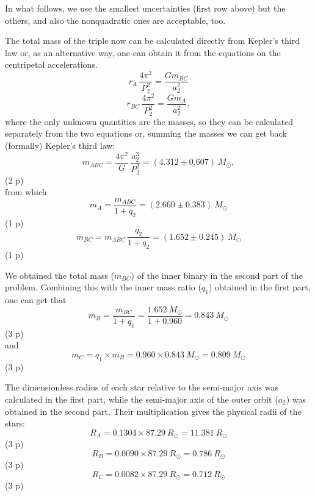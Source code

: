 \begin{description}
  In what follows, we use the smallest uncertainties (first row above) but
  the others, and also the nonquadratic ones are acceptable, too.

  The total mass of the triple now can be calculated directly from Kepler's
  third law or, as an alternative way, one can obtain it from the equations
  on the centripetal accelerations.
  \[ r_A\,\frac{4\pi^2}{P_2^2} = \frac{G m_{BC}}{a_2^2}
     \tag*{(2.46)} \]
  \[ r_{BC}\,\frac{4\pi^2}{P_2^2} = \frac{G m_A}{a_2^2},
     \tag*{(2.47)} \]
  where the only unknown quantities are the masses, so they can be
  calculated separately from the two equations or, summing the masses we can
  get back (formally) Kepler's third law:
  \[ m_{ABC} = \frac{4\pi^2}{G}\,\frac{a_2^3}{P_2^2}
     = (4.312 \pm 0.607)\ M_\odot,
     \tag*{(2.48)} \]
  \hfill(2 p)\\
  from which
  \[ m_A = \frac{m_{ABC}}{1 + q_2} = (2.660 \pm 0.383)\ M_\odot
     \tag*{(2.49)} \]
  \hfill(1 p)
  \[ m_{BC} = m_{ABC}\,\frac{q_2}{1 + q_2} = (1.652 \pm 0.245)\ M_\odot
     \tag*{(2.50)} \]
  \hfill(1 p)

\item[iii)] We obtained the total mass ($m_{BC}$) of the inner binary in the
  second part of the problem. Combining this with the inner mass ratio
  ($q_1$) obtained in the first part, one can get that
  \[ m_B = \frac{m_{BC}}{1 + q_1}
     = \frac{1.652\ M_\odot}{1 + 0.960} = 0.843\ M_\odot
     \tag*{(2.51)} \]
  \hfill(3 p)\\
  and
  \[ m_C = q_1 \times m_B = 0.960 \times 0.843\ M_\odot = 0.809\ M_\odot
     \tag*{(2.52)} \]
  \hfill(3 p)

  The dimensionless radius of each star relative to the semi-major axis was
  calculated in the first part, while the semi-major axis of the outer orbit
  ($a_2$) was obtained in the second part. Their multiplication gives the
  physical radii of the stars:
  \[ R_A = 0.1304 \times 87.29\ R_\odot = 11.381\ R_\odot
     \tag*{(2.53)} \]
  \hfill(3 p)
  \[ R_B = 0.0090 \times 87.29\ R_\odot = 0.786\ R_\odot
     \tag*{(2.54)} \]
  \hfill(3 p)
  \[ R_C = 0.0082 \times 87.29\ R_\odot = 0.712\ R_\odot
     \tag*{(2.55)} \]
  \hfill(3 p)
\end{description}
